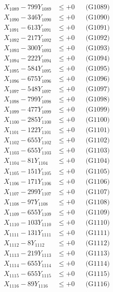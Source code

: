 \documentclass[a4paper,10pt]{article}
\begin{document}
{\begin{align}
X_{1089} - 799Y_{1089} &\leq +0 && \text{(G1089)} \\
X_{1090} - 346Y_{1090} &\leq +0 && \text{(G1090)} \\
\allowbreak
X_{1091} - 613Y_{1091} &\leq +0 && \text{(G1091)} \\
X_{1092} - 217Y_{1092} &\leq +0 && \text{(G1092)} \\
X_{1093} - 300Y_{1093} &\leq +0 && \text{(G1093)} \\
X_{1094} - 222Y_{1094} &\leq +0 && \text{(G1094)} \\
X_{1095} - 584Y_{1095} &\leq +0 && \text{(G1095)} \\
X_{1096} - 675Y_{1096} &\leq +0 && \text{(G1096)} \\
X_{1097} - 548Y_{1097} &\leq +0 && \text{(G1097)} \\
X_{1098} - 799Y_{1098} &\leq +0 && \text{(G1098)} \\
X_{1099} - 477Y_{1099} &\leq +0 && \text{(G1099)} \\
X_{1100} - 285Y_{1100} &\leq +0 && \text{(G1100)} \\
\allowbreak
X_{1101} - 122Y_{1101} &\leq +0 && \text{(G1101)} \\
X_{1102} - 655Y_{1102} &\leq +0 && \text{(G1102)} \\
X_{1103} - 655Y_{1103} &\leq +0 && \text{(G1103)} \\
X_{1104} - 81Y_{1104} &\leq +0 && \text{(G1104)} \\
X_{1105} - 151Y_{1105} &\leq +0 && \text{(G1105)} \\
X_{1106} - 171Y_{1106} &\leq +0 && \text{(G1106)} \\
X_{1107} - 299Y_{1107} &\leq +0 && \text{(G1107)} \\
X_{1108} - 97Y_{1108} &\leq +0 && \text{(G1108)} \\
X_{1109} - 655Y_{1109} &\leq +0 && \text{(G1109)} \\
X_{1110} - 103Y_{1110} &\leq +0 && \text{(G1110)} \\
\allowbreak
X_{1111} - 131Y_{1111} &\leq +0 && \text{(G1111)} \\
X_{1112} - 8Y_{1112} &\leq +0 && \text{(G1112)} \\
X_{1113} - 219Y_{1113} &\leq +0 && \text{(G1113)} \\
X_{1114} - 655Y_{1114} &\leq +0 && \text{(G1114)} \\
X_{1115} - 655Y_{1115} &\leq +0 && \text{(G1115)} \\
X_{1116} - 89Y_{1116} &\leq +0 && \text{(G1116)} \\

\end{align}}
\end{document}
